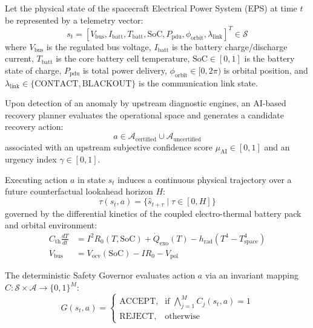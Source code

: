 \documentclass[conference]{IEEEtran}
\begin{document}
Let the physical state of the spacecraft Electrical Power System (EPS) at time $t$ be represented by a telemetry vector:
\begin{equation}
s_t = \left[ V_{\text{bus}}, I_{\text{batt}}, T_{\text{batt}}, \text{SoC}, P_{\text{pdu}}, \phi_{\text{orbit}}, \lambda_{\text{link}} \right]^T \in \mathcal{S}
\end{equation}
where $V_{\text{bus}}$ is the regulated bus voltage, $I_{\text{batt}}$ is the battery charge/discharge current, $T_{\text{batt}}$ is the core battery cell temperature, $\text{SoC} \in [0, 1]$ is the battery state of charge, $P_{\text{pdu}}$ is total power delivery, $\phi_{\text{orbit}} \in [0, 2\pi)$ is orbital position, and $\lambda_{\text{link}} \in \{\text{CONTACT}, \text{BLACKOUT}\}$ is the communication link state.

Upon detection of an anomaly by upstream diagnostic engines, an AI-based recovery planner evaluates the operational space and generates a candidate recovery action:
\begin{equation}
a \in \mathcal{A}_{\text{certified}} \cup \mathcal{A}_{\text{uncertified}}
\end{equation}
associated with an upstream subjective confidence score $\mu_{\text{AI}} \in [0, 1]$ and an urgency index $\gamma \in [0, 1]$.

Executing action $a$ in state $s_t$ induces a continuous physical trajectory over a future counterfactual lookahead horizon $H$:
\begin{equation}
\tau(s_t, a) = \{ \hat{s}_{t+\tau} \mid \tau \in [0, H] \}
\end{equation}
governed by the differential kinetics of the coupled electro-thermal battery pack and orbital environment:
\begin{align}
C_{\text{th}} \frac{dT}{dt} &= I^2 R_0(T, \text{SoC}) + \dot{Q}_{\text{exo}}(T) - h_{\text{rad}} (T^4 - T_{\text{space}}^4) \\
V_{\text{bus}} &= V_{\text{ocv}}(\text{SoC}) - I R_0 - V_{\text{pol}}
\end{align}

The deterministic Safety Governor evaluates action $a$ via an invariant mapping $C: \mathcal{S} \times \mathcal{A} \rightarrow \{0, 1\}^M$:
\begin{equation}
G(s_t, a) = 
\begin{cases}
\text{ACCEPT}, & \text{if } \bigwedge_{j=1}^M C_j(s_t, a) = 1 \\
\text{REJECT}, & \text{otherwise}
\end{cases}
\end{equation}
\end{document}

